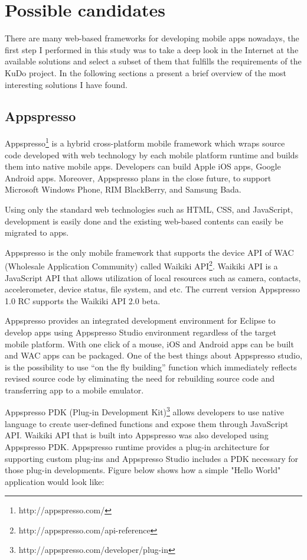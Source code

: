 \documentclass[a4paper,12pt]{book}
\begin{document}
\section{Possible candidates}
\label{sec:candidates}
 
There are many web-based frameworks for developing mobile apps nowadays, the first step I performed in this study was to take a deep look in the Internet at the available solutions and select a subset of them that fulfills the requirements of the KuDo project. In the following sections a present a brief overview of the most interesting solutions I have found.
 
\subsection{Appspresso}
\label{Appspresso} 
 
Appspresso\footnote{http://appspresso.com/}  is a hybrid cross-platform mobile framework which wraps source code developed with web technology by each mobile platform runtime and builds them into native mobile apps. Developers can build Apple iOS apps, Google Android apps. Moreover, Appspresso plans in the close future, to support Microsoft Windows Phone, RIM BlackBerry, and Samsung Bada. 

Using only the standard web technologies such as HTML, CSS, and JavaScript, development is easily done  and the existing web-based contents can easily be migrated to apps.

Appspresso is the only mobile framework that supports the device API of WAC (Wholesale Application Community) called Waikiki API\footnote{http://appspresso.com/api-reference}. Waikiki API is a JavaScript API that allows utilization of local resources such as camera, contacts, accelerometer, device status, file system, and etc. The current version Appspresso 1.0 RC supports the Waikiki API 2.0 beta.

Appspresso provides an integrated development environment for Eclipse to develop apps using Appspresso Studio environment regardless of the target mobile platform. With one click of a mouse, iOS and Android apps can be built and WAC apps can be packaged. One of the best things about Appspresso studio, is the possibility to use “on the fly building” function which immediately reflects revised source code by eliminating the need for rebuilding source code and transferring app to a mobile emulator. 

Appspresso PDK (Plug-in Development Kit)\footnote{http://appspresso.com/developer/plug-in}   allows developers to use native language to create user-defined functions and expose them through JavaScript API. Waikiki API that is built into Appspresso was also developed using Appspresso PDK. Appspresso runtime provides a plug-in architecture for supporting custom plug-ins and Appspresso Studio includes a PDK necessary for those plug-in developments. Figure below shows how a simple "Hello World" application would look like:
\end{document}
